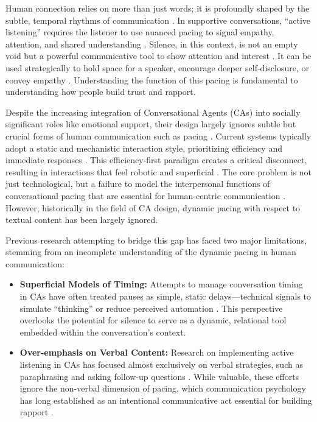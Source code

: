 Human connection relies on more than just words; it is profoundly shaped by the subtle, temporal rhythms of communication \cite{bruneau1973communicative}. In supportive conversations, ``active listening'' requires the listener to use nuanced pacing to signal empathy, attention, and shared understanding \cite{weger2014relative}. Silence, in this context, is not an empty void but a powerful communicative tool to show attention and interest \cite{bruneau1973communicative}. It can be used strategically to hold space for a speaker, encourage deeper self-disclosure, or convey empathy \cite{levitt2001sounds, back2009compassionate}. Understanding the function of this pacing is fundamental to understanding how people build trust and rapport.

Despite the increasing integration of Conversational Agents (CAs) into socially significant roles like emotional support, their design largely ignores subtle but crucial forms of human communication such as pacing \cite{gnewuch2022opposing}. Current systems typically adopt a static and mechanistic interaction style, prioritizing efficiency and immediate responses \cite{10.1145/3706598.3713503, nandy2025balancing}. This efficiency-first paradigm creates a critical disconnect, resulting in interactions that feel robotic and superficial \cite{gnewuch2022opposing}. The core problem is not just technological, but a failure to model the interpersonal functions of conversational pacing that are essential for human-centric communication \cite{templeton2023listening, templeton2022fast}. However, historically in the field of CA design, dynamic pacing with respect to textual content has been largely ignored.

Previous research attempting to bridge this gap has faced two major limitations, stemming from an incomplete understanding of the dynamic pacing in human communication:
\begin{itemize}
    \item \textbf{Superficial Models of Timing:} Attempts to manage conversation timing in CAs have often treated pauses as simple, static delays—technical signals to simulate ``thinking'' or reduce perceived automation \cite{park2019slow, 10.1145/3640794.3665550}. This perspective overlooks the potential for silence to serve as a dynamic, relational tool embedded within the conversation's context.
    \item \textbf{Over-emphasis on Verbal Content:} Research on implementing active listening in CAs has focused almost exclusively on verbal strategies, such as paraphrasing and asking follow-up questions \cite{collins2022listening}. While valuable, these efforts ignore the non-verbal dimension of pacing, which communication psychology has long established as an intentional communicative act essential for building rapport \cite{back2009compassionate}.
\end{itemize}

